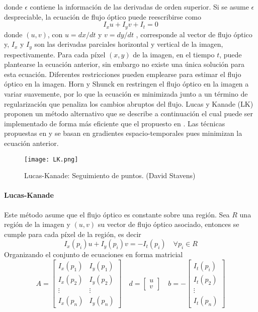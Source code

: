 donde $\epsilon$ contiene la información de las derivadas de orden superior. Si se asume $\epsilon$ despreciable, la ecuación de flujo óptico puede reescribirse como
\begin{equation}
  I_xu +I_yv+I_t = 0
\end{equation}
donde $(u,v)$, con $u = dx/dt$ y $v = dy/dt$ , corresponde al vector de flujo óptico y, $I_x$ y $I_y$ son las derivadas parciales horizontal y vertical de la imagen, respectivamente. Para cada píxel $(x,y)$ de la imagen, en el tiempo $t$, puede plantearse la ecuación anterior, sin embargo no existe una única solución para esta ecuación. Diferentes restricciones pueden emplearse para estimar el flujo óptico en la imagen. Horn y Shunck en \cite{Horn} restringen el flujo óptico en la imagen a variar suavemente, por lo que la ecuación es minimizada junto a un término de regularización que penaliza los cambios abruptos del flujo. Lucas y Kanade (LK) \cite{LKanade} proponen un método alternativo que se describe a continuación el cual puede ser implementado de forma más eficiente que el propuesto en \cite{Horn}. Las técnicas propuestas en \cite{Horn} y \cite{LKanade} se basan en gradientes espacio-temporales pues minimizan la ecuación anterior. 
\begin{figure}
  \centering
  \texttt{[image: LK.png]}
  \caption{Lucas-Kanade: Seguimiento de puntos. (David Stavens)}
  \label{fig:overviewLK}
\end{figure}

\paragraph{Lucas-Kanade}
Este método asume que el flujo óptico es constante sobre una región. Sea $R$ una región de la imagen y $(u,v)$ su vector de flujo óptico asociado, entonces se cumple para cada píxel de la región, es decir
\begin{equation}
  I_x(p_i)u+I_y(p_i)v = -I_t(p_i) \quad  \forall p_i \in R
\end{equation}
Organizando el conjunto de ecuaciones en forma matricial
\begin{equation}
  A=
  \begin{bmatrix}
    I_x(p_1) & I_y(p_1) \\
    I_x(p_2) & I_y(p_2) \\
    \vdots  & \vdots  \\
    I_x(p_n) & I_y(p_n) 
  \end{bmatrix}
  \quad
  d=
  \begin{bmatrix}
    u\\
    v
  \end{bmatrix}
  \quad
  b = -
  \begin{bmatrix}
    I_t(p_i) \\
    I_t(p_2) \\
    \vdots  \\
    I_t(p_n)
  \end{bmatrix} 
\end{equation}

